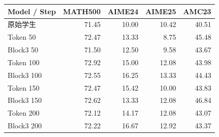 \begin{tabular}{lrrrr}
\toprule
Model / Step & MATH500 & AIME24 & AIME25 & AMC23 \\
\midrule
原始学生 & 71.45 & 10.00 & 10.42 & 40.51 \\
Token 50 & 72.47 & 13.33 & 8.75 & 45.48 \\
Block3 50 & 71.50 & 12.50 & 9.58 & 43.67 \\
Token 100 & 72.92 & 15.00 & 12.08 & 43.98 \\
Block3 100 & 72.55 & 16.25 & 13.33 & 44.43 \\
Token 150 & 72.47 & 15.42 & 10.00 & 43.83 \\
Block3 150 & 72.62 & 13.33 & 12.08 & 46.84 \\
Token 200 & 72.12 & 14.17 & 12.08 & 43.07 \\
Block3 200 & 72.22 & 16.67 & 12.92 & 43.37 \\
\bottomrule
\end{tabular}
